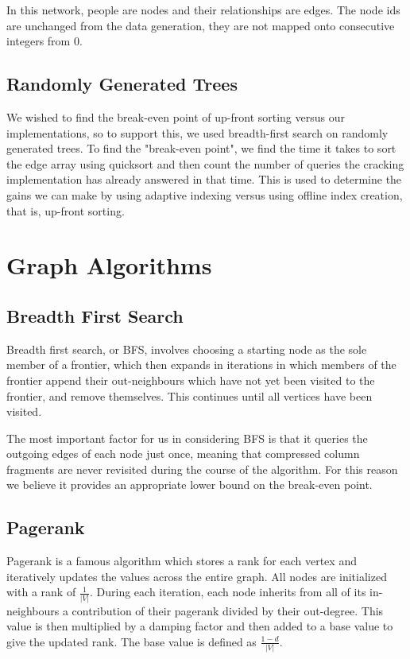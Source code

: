 In this network, people are nodes and their relationships are edges. The node ids are unchanged from the data generation, they are not mapped onto consecutive integers from 0.

\subsection{Randomly Generated Trees}

We wished to find the break-even point of up-front sorting versus our implementations, so to support this, we used breadth-first search on randomly generated trees. To find the "break-even point", we find the time it takes to sort the edge array using quicksort \cite{doi:10.1093/comjnl/5.1.10} and then count the number of queries the cracking implementation has already answered in that time. This is used to determine the gains we can make by using adaptive indexing versus using offline index creation, that is, up-front sorting.

\section{Graph Algorithms}

\subsection{Breadth First Search}

Breadth first search, or BFS, involves choosing a starting node as the sole member of a frontier, which then expands in iterations in which members of the frontier append their out-neighbours which have not yet been visited to the frontier, and remove themselves. This continues until all vertices have been visited.

The most important factor for us in considering BFS is that it queries the outgoing edges of each node just once, meaning that compressed column fragments are never revisited during the course of the algorithm. For this reason we believe it provides an appropriate lower bound on the break-even point.

\subsection{Pagerank}

Pagerank \cite{ilprints422} is a famous algorithm which stores a rank for each vertex and iteratively updates the values across the entire graph. All nodes are initialized with a rank of $\frac{1}{|V|}$. During each iteration, each node inherits from all of its in-neighbours a contribution of their pagerank divided by their out-degree. This value is then multiplied by a damping factor and then added to a base value to give the updated rank. The base value is defined as $\frac{1 - d}{|V|}$.

